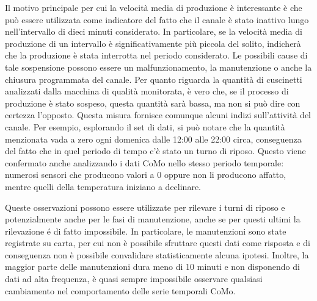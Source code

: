 Il motivo principale per cui la velocità media di produzione è interessante è che può essere utilizzata come indicatore del fatto che il canale è stato inattivo lungo nell'intervallo di dieci minuti considerato. In particolare, se la velocità media di produzione di un intervallo è significativamente più piccola del solito, indicherà che la produzione è stata interrotta nel periodo considerato. Le possibili cause di tale sospensione possono essere un malfunzionamento, la manutenzione o anche la chiusura programmata del canale.
Per quanto riguarda la quantità di cuscinetti analizzati dalla macchina di qualità monitorata, è vero che, se il processo di produzione è stato sospeso, questa quantità sarà bassa, ma non si può dire con certezza l'opposto.
Questa misura fornisce comunque alcuni indizi sull'attività del canale. Per esempio, esplorando il set di dati, si può notare che la quantità menzionata vada a zero ogni domenica dalle 12:00 alle 22:00 circa, conseguenza del fatto che in quel periodo di tempo c'è stato un turno di riposo. Questo viene confermato anche analizzando i dati CoMo nello stesso periodo temporale: numerosi sensori che producono valori a 0 oppure non li producono affatto, mentre quelli della temperatura iniziano a declinare. 

Queste osservazioni possono essere utilizzate per rilevare i turni di riposo e potenzialmente anche per le fasi di manutenzione, anche se per questi ultimi la rilevazione é di fatto impossibile. In particolare, le manutenzioni sono state registrate su carta, per cui non è possibile sfruttare questi dati come risposta e di conseguenza non è possibile convalidare statisticamente alcuna ipotesi.
Inoltre, la maggior parte delle manutenzioni dura meno di 10 minuti e
non disponendo di dati ad alta frequenza, è quasi sempre impossibile
osservare qualsiasi cambiamento nel comportamento delle serie temporali CoMo. 

